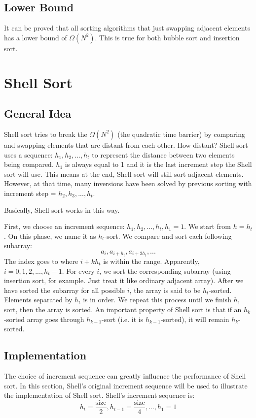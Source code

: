 \documentclass[12pt]{book}
\begin{document}
\section{Lower Bound}
\label{sec:orgd84e87c}
It can be proved that all sorting algorithms that just swapping adjacent elements has a lower bound of \(\Omega(N^2)\). This is true for both bubble sort and insertion sort.
\chapter{Shell Sort}
\label{sec:org69342ff}
\section{General Idea}
\label{sec:org476bd8a}
Shell sort tries to break the \(\Omega(N^2)\) (the quadratic time barrier) by comparing and swapping elements that are distant from each other. How distant? Shell sort uses a sequence: \(h_1, h_2, ..., h_t\) to represent the distance between two elements being compared. \(h_1\) is always equal to 1 and it is the last increment step the Shell sort will use. This means at the end, Shell sort will still sort adjacent elements. However, at that time, many inversions have been solved by previous sorting with increment step = \(h_2, h_3, ..., h_t\).

Basically, Shell sort works in this way.

First, we choose an increment sequence: \(h_1, h_2, ..., h_t, h_1 = 1\). We start from \(h = h_t\). On this phase, we name it as \(h_t\)-sort. We compare and sort each following subarray:
\begin{equation*}
a_i, a_{i + h_t}, a_{i + 2h_t}, ...
\end{equation*}
The index goes to where \(i + kh_t\) is within the range. Apparently, \(i = 0, 1, 2, ..., h_t - 1\). For every \(i\), we sort the corresponding subarray (using insertion sort, for example. Just treat it like ordinary adjacent array). After we have sorted the subarray for all possible \(i\), the array is said to be \(h_t\)-sorted. Elements separated by \(h_t\) is in order. We repeat this process until we finish \(h_1\) sort, then the array is sorted. An important property of Shell sort is that if an \(h_k\)-sorted array goes through \(h_{k - 1}\)-sort (i.e. it is \(h_{k - 1}\)-sorted), it will remain \(h_k\)-sorted.
\section{Implementation}
\label{sec:orga666197}
The choice of increment sequence can greatly influence the performance of Shell sort. In this section, Shell's original increment sequence will be used to illustrate the implementation of Shell sort. Shell's increment sequence is:
\[
h_t = \frac {\text {size}} {2}, h_{t - 1} = \frac {\text{size}} {4}, ..., h_1 = 1
\]
\end{document}
